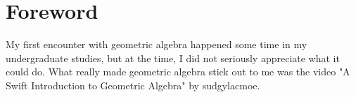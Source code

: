 \chapter*{Foreword}

My first encounter with geometric algebra happened some time in my undergraduate studies, but at
the time, I did not seriously appreciate what it could do. What really made geometric algebra stick
out to me was the video "A Swift Introduction to Geometric Algebra" by sudgylacmoe. 

